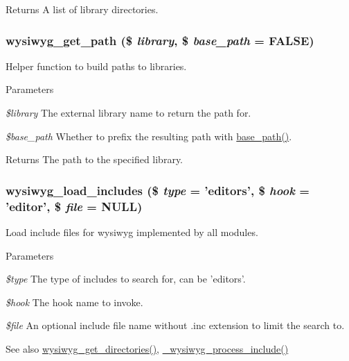 \begin{DoxyReturn}{Returns}
A list of library directories. 
\end{DoxyReturn}
\hypertarget{group__wysiwyg__api_ga328c8919e7a4bb96cf7a19f098313319}{
\subsubsection[{wysiwyg\_\-get\_\-path}]{\setlength{\rightskip}{0pt plus 5cm}wysiwyg\_\-get\_\-path (\$ {\em library}, \/  \$ {\em base\_\-path} = {\ttfamily FALSE})}}
\label{group__wysiwyg__api_ga328c8919e7a4bb96cf7a19f098313319}
Helper function to build paths to libraries.


\begin{DoxyParams}{Parameters}
\item[{\em \$library}]The external library name to return the path for. \item[{\em \$base\_\-path}]Whether to prefix the resulting path with \hyperlink{common_8inc_ae227697e9c239f09fd7e36f71afde771}{base\_\-path()}.\end{DoxyParams}
\begin{DoxyReturn}{Returns}
The path to the specified library. 
\end{DoxyReturn}
\hypertarget{group__wysiwyg__api_gae5880da976120e85f7bb8aeda815b060}{
\subsubsection[{wysiwyg\_\-load\_\-includes}]{\setlength{\rightskip}{0pt plus 5cm}wysiwyg\_\-load\_\-includes (\$ {\em type} = {\ttfamily 'editors'}, \/  \$ {\em hook} = {\ttfamily 'editor'}, \/  \$ {\em file} = {\ttfamily NULL})}}
\label{group__wysiwyg__api_gae5880da976120e85f7bb8aeda815b060}
Load include files for wysiwyg implemented by all modules.


\begin{DoxyParams}{Parameters}
\item[{\em \$type}]The type of includes to search for, can be 'editors'. \item[{\em \$hook}]The hook name to invoke. \item[{\em \$file}]An optional include file name without .inc extension to limit the search to.\end{DoxyParams}
\begin{DoxySeeAlso}{See also}
\hyperlink{group__wysiwyg__api_ga47660e98db185a3c9de431b94e280977}{wysiwyg\_\-get\_\-directories()}, \hyperlink{group__wysiwyg__api_ga81487ce9ea49d7ca7b052bb8f2e8fcc8}{\_\-wysiwyg\_\-process\_\-include()} 
\end{DoxySeeAlso}
